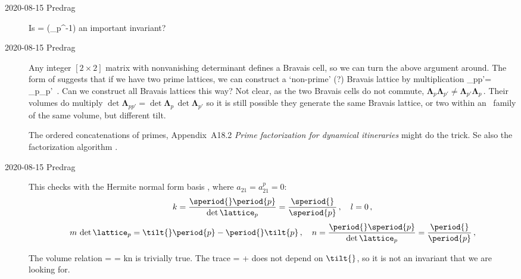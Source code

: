 \begin{description}
	\item[2020-08-15 Predrag]
Is
\beq
\tr \left[\begin{array}{cc}
k & m \\
l & n
\end{array}\right]
=
\tr\left(\mathbf{\Lambda}_p^{-1}\mathbf{\Lambda}\right)
an important invariant?

	\item[2020-08-15 Predrag]
Any integer $[2\times2]$ matrix with nonvanishing determinant defines a
Bravais cell, so we can turn the above argument around. The form of
 suggests that if we have two prime lattices, we
can construct a `non-prime' (?) Bravais lattice by multiplication
\beq
\mathbf{\Lambda}_{pp'}=
\mathbf{\Lambda}_p\mathbf{\Lambda}_{p'}
\,.
\label{Lambda_pp'}
\eeq
Can we construct all Bravais lattices this way?
Not clear, as the two Bravais cells do not commute,
\(
\mathbf{\Lambda}_p\mathbf{\Lambda}_{p'}
\neq \mathbf{\Lambda}_{p'}\mathbf{\Lambda}_p
\,.
\)
Their volumes do multiply
\(
\det\mathbf{\Lambda}_{pp'}=
\det\mathbf{\Lambda}_p \, \det\mathbf{\Lambda}_{p'}
\)
so it is still possible they generate the same Bravais lattice,
or two within an \rpo\ family of the same volume, but different tilt.

The ordered concatenations of primes,
 {Appendix~A18.2}
{{\em Prime factorization for dynamical itineraries}} might do the trick.
Se also the factorization algorithm .


	\item[2020-08-15 Predrag]
This checks with the Hermite normal form basis
, where
$a_{21}=a^p_{21}=0$:
\[
k = \frac{\speriod{}\period{p}}{\det\lattice_p}
  = \frac{\speriod{}}{\speriod{p}}
\,,\quad
l = 0
\,,
\]
\[
 m\,\det\lattice_p = \tilt{}\period{p}-\period{}\tilt{p}
\,,\quad
n = \frac{\period{} \speriod{p}}{\det\lattice_p}
  = \frac{\period{}}{\period{p}}
\,,
\]

The volume relation
\beq
{}
=
\det \left[\begin{array}{cc}
k & m \\
0 & n
\end{array}\right]
= kn
is trivially true. The trace 
\beq
\tr \left[\begin{array}{cc}
k & m \\
l & n
\end{array}\right]
=   
  + 
does not depend on $\tilt{}$, so it is not an invariant that we are
looking for.


\end{description}
